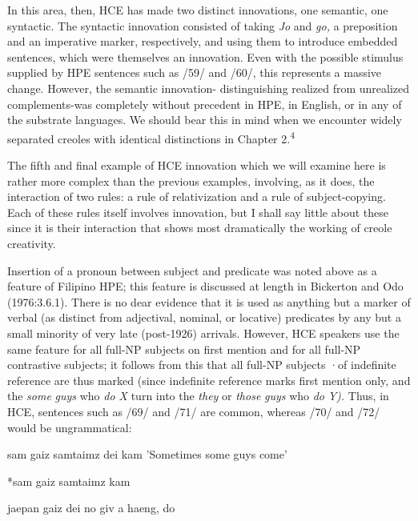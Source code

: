 In this area, then, HCE has made two distinct innovations, one semantic, one syntactic. The syntactic innovation consisted of taking \textit{Jo} and \textit{go,} a preposition and an imperative marker, respectively, and using them to introduce embedded sentences, which were themselves an innovation. Even with the possible stimulus supplied by HPE sen\-tences such as /59/ and /60/, this represents a massive change. However, the semantic innovation- distinguishing realized from unrealized com\-plements-was completely without precedent in HPE, in English, or in any of the substrate languages. We should bear this in mind when we encounter widely separated creoles with identical distinctions in Chapter 2.\textsuperscript{4}

The fifth and final example of HCE innovation which we will examine here is rather more complex than the previous examples, involving, as it does, the interaction of two rules: a rule of relativization and a rule of subject-copying. Each of these rules itself involves inno\-vation, but I shall say little about these since it is their interaction that shows most dramatically the working of creole creativity.







Insertion of a pronoun between subject and predicate was noted above as a feature of Filipino HPE; this feature is discussed at length in Bickerton and Odo (1976:3.6.1). There is no dear evidence that it is used as anything but a marker of verbal (as distinct from adjectival, nominal, or locative) predicates by any but a small minority of very late (post-1926) arrivals. However, HCE speakers use the same feature for all full-NP subjects on first mention and for all full-NP contrastive subjects; it follows from this that all full-NP subjects ·of indefinite refer\-ence are thus marked (since indefinite reference marks first mention only, and the \textit{some} \textit{guys} who \textit{do X }turn into the \textit{they} or \textit{those} \textit{guys }who \textit{do} \textit{Y}\textit{).} Thus, in HCE, sentences such as /69/ and /71/ are common, whereas /70/ and /72/ would be ungrammatical:

\ea\label{ex:69}
sam gaiz samtaimz dei kam 'Sometimes some guys come'
\glt
\z

\ea\label{ex:70}
*sam gaiz samtaimz kam
\glt
\z

\ea\label{ex:71}
jaepan gaiz dei no giv a haeng, do
\glt
\z

